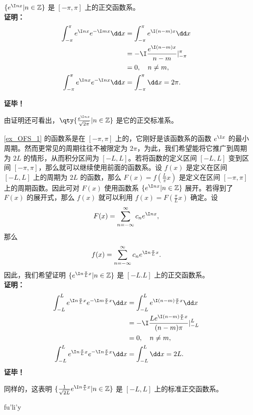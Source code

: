  \begin{example}{}\label{ex_OFS_1}
 $\{e^{\I nx}|n\in\mathbb Z\}$ 是 $[-\pi,\pi]$ 上的正交函数系。\\
 
\textbf{证明：}
\begin{equation}
\begin{aligned}
\int_{-\pi}^\pi e^{\I nx}e^{-\I mx}\dd x&=\int_{-\pi}^\pi e^{\I (n-m)x}\dd x\\&=-\I\frac{e^{\I(n-m)x}}{n-m}{\huge|}_{-\pi}^{\pi}\\
&=0,\quad n\neq m,\\
\int_{-\pi}^\pi e^{\I nx}e^{-\I nx}\dd x&=\int_{-\pi}^\pi \dd x=2\pi.
\end{aligned}~
\end{equation}

\textbf{证毕！}

由证明还可看出，$\qty{\frac{e^{\I nx}}{\sqrt{2\pi}}{\huge|}n\in\mathbb Z}$ 是它的正交标准系。
 \end{example}
 \begin{example}{}
 \autoref{ex_OFS_1} 的函数系是在 $[-\pi,\pi]$ 上的，它刚好是该函数系的函数 $e^{\I x}$ 的最小周期。然而更常见的周期往往不被限定为 $2\pi$，为此，我们希望能将它推广到周期为 $2L$ 的情形，从而积分区间为 $[-L,L]$。若将函数的定义区间 $[-L,L]$ 变到区间 $[-\pi,\pi]$，那么就可以继续使用前面的函数系。设 $f(x)$ 是定义在区间 $[-L,L]$ 上的周期为 $2L$ 的函数，那么 $F(x)=f(\frac{L}{\pi}x)$ 是定义在区间 $[-\pi,\pi]$ 上的周期函数。因此可对 $F(x)$ 使用函数系 $\{e^{\I nx}|n\in\mathbb Z\}$ 展开。若得到了 $F(x)$ 的展开式，那么 $f(x)$ 就可以利用 $f(x)=F(\frac{\pi}{L}x)$ 确定。设 
 \begin{equation}
 F(x)=\sum_{n=-\infty}^\infty c_ne^{\I n x},~
 \end{equation}
 那么
 \begin{equation}
 f(x)=\sum_{n=-\infty}^\infty c_ne^{\I n\frac{\pi}{L} x}.~
 \end{equation}
 因此，我们希望证明 $\{e^{\I n\frac{\pi}{L} x}|n\in\mathbb Z\}$ 是 $[-L.L]$ 上的正交函数系。\\
\textbf{证明：}
\begin{equation}
\begin{aligned}
\int_{-L}^L e^{\I n\frac{\pi}{L}x}e^{-\I m\frac{\pi}{L}x}\dd x&=\int_{-L}^L e^{\I (n-m)\frac{\pi}{L}x}\dd x\\
&=-\I\frac{Le^{\I(n-m)\frac{\pi}{L}x}}{(n-m)\pi}{\huge|}_{-L}^{L}\\
&=0,\quad n\neq m,\\
\int_{-L}^L e^{\I n\frac{\pi}{L}x}e^{-\I n\frac{\pi}{L}x}\dd x&=\int_{-L}^L \dd x=2L.
\end{aligned}~
\end{equation}
\textbf{证毕！}

同样的，这表明 $\{\frac{1}{\sqrt{2L}}e^{\I n\frac{\pi}{L} x}|n\in\mathbb Z\}$ 是 $[-L,L]$ 上的标准正交函数系。
 \end{example}

\begin{example}{fu'li'y}

\end{example}